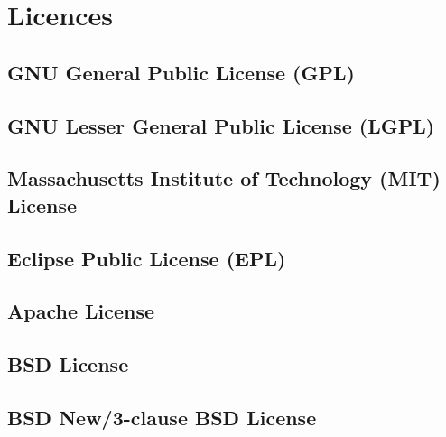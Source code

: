 \documentclass[10pt, a4paper, final]{article}
\begin{document}
\section*{Licences}

\subsection*{GNU General Public License (GPL)}



\subsection*{GNU Lesser General Public License (LGPL)}

\subsection*{Massachusetts Institute of Technology (MIT) License}

\subsection*{Eclipse Public License (EPL)}

\subsection*{Apache License}

\subsection*{BSD License}

\subsection*{BSD New/3-clause BSD License}
\end{document}
